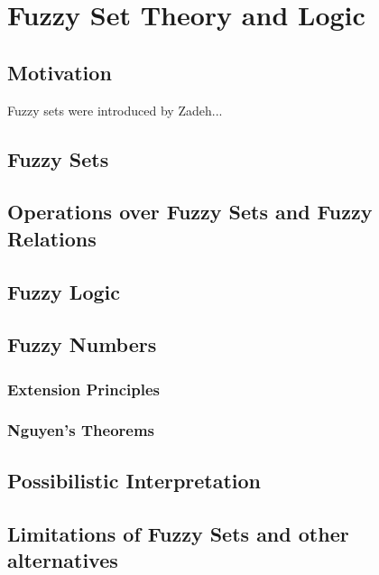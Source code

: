 \chapter{Fuzzy Set Theory and Logic}
\section*{Motivation}
Fuzzy sets were introduced by Zadeh...

\section{Fuzzy Sets}

\section{Operations over Fuzzy Sets and Fuzzy Relations}

\section{Fuzzy Logic}\label{sec:fuzzy_logic}
\section{Fuzzy Numbers}\label{sec:fuzzy_numbers}

\subsection{Extension Principles}
\subsection{Nguyen's Theorems}
\section{Possibilistic Interpretation}

\section{Limitations of Fuzzy Sets and other alternatives}